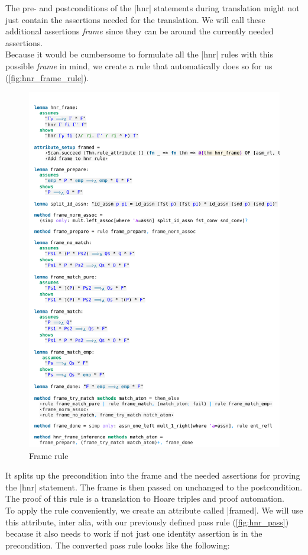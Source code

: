 The pre- and postconditions of the |hnr| statements during translation might not just contain the assertions needed for the translation. We will call these additional assertions \textit{frame} since they can be around the currently needed assertions. \\
Because it would be cumbersome to formulate all the |hnr| rules with this possible \textit{frame} in mind, we create a rule that automatically does so for us (\autoref{fig:hnr_frame_rule}).

\begin{figure}[htpb]
    \includegraphics[trim={0 25,8cm 0 1cm}, clip, width=1.00\textwidth]{figures/Theory_Hnr_Frame.pdf}
    \caption[Frame rule]{Frame rule}
    \label{fig:hnr_frame_rule}
\end{figure}

\noindent It splits up the precondition into the frame and the needed assertions for proving the |hnr| statement. The frame is then passed on unchanged to the postcondition.\\
The proof of this rule is a translation to Hoare triples and proof automation.\\
To apply the rule conveniently, we create an attribute called |framed|. We will use this attribute, inter alia, with our previously defined pass rule (\autoref{fig:hnr_pass}) because it also needs to work if not just one identity assertion is in the precondition.
The converted pass rule looks like the following:

